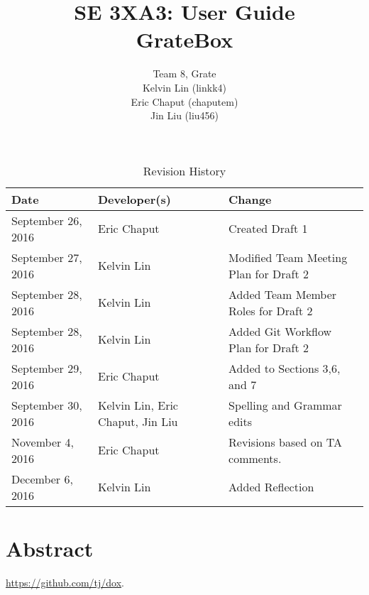 \documentclass{article}
\title{SE 3XA3: User Guide\\GrateBox}
\author{Team 8, Grate
		\\ Kelvin Lin (linkk4)
		\\ Eric Chaput (chaputem)
		\\ Jin Liu (liu456)
}
\date{}
\begin{document}
\begin{table}[hp]
\caption{Revision History} \label{TblRevisionHistory}
\begin{tabularx}{\textwidth}{llX}
\toprule
\textbf{Date} & \textbf{Developer(s)} & \textbf{Change}\\
\midrule
September 26, 2016 & Eric Chaput & Created Draft 1\\
September 27, 2016 & Kelvin Lin & Modified Team Meeting Plan for Draft 2\\
September 28, 2016 & Kelvin Lin & Added Team Member Roles for Draft 2\\
September 28, 2016 & Kelvin Lin & Added Git Workflow Plan for Draft 2\\
September 29, 2016 & Eric Chaput & Added to Sections 3,6, and 7\\
September 30, 2016 & Kelvin Lin, Eric Chaput, Jin Liu & Spelling and Grammar 
edits\\
November 4, 2016 & Eric Chaput & Revisions based on TA comments.\\
December 6, 2016 & Kelvin Lin & Added Reflection\\
\bottomrule
\end{tabularx}
\end{table}

\newpage

\maketitle

\section{Abstract}

\href{https://github.com/tj/dox}{https://github.com/tj/dox}.
\end{document}

